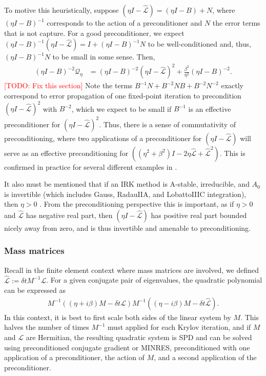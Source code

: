 \documentclass[review]{siamart}
\makeatletter
\newcommand{\todo}[1]{\textcolor{red}{[TODO\@: #1]}}
\makeatother
\begin{document}
To motive this heuristically, suppose $(\eta I - \widehat{\mathcal{L}}) = (\eta I - B)+N$,
where $(\eta I - B)^{-1}$ corresponds to the action of a preconditioner and $N$ the error
terms that is not capture. For a good preconditioner, we expect
$(\eta I - B)^{-1}(\eta I - \widehat{\mathcal{L}}) = I+(\eta I - B)^{-1}N$ to be
well-conditioned and, thus, $(\eta I - B)^{-1}N$ to be small in some sense. Then,
%
\begin{align*}
(\eta I - B)^{-2}\mathcal{Q}_\eta & = (\eta I - B)^{-2}(\eta I - \widehat{\mathcal{L}})^{2}
	+ \frac{\beta^2}{\eta^2}(\eta I - B)^{-2}.
\end{align*}
%
\todo{Fix this section}
Note the terms $B^{-1}N + B^{-2}NB + B^{-2}N^{-2}$ exactly correspond to error
propagation of one fixed-point iteration to precondition $(\eta I - \widehat{\mathcal{L}})^2$
with $B^{-2}$, which we expect to be small if $B^{-1}$ is an effective preconditioner
for $(\eta I - \widehat{\mathcal{L}})^2$. Thus, there is a sense of commutativity of
preconditioning, where two applications of a preconditioner for $(\eta I -
\widehat{\mathcal{L}})$ will serve as an effective preconditioning for
$((\eta^2+\beta^2)I - 2\eta \widehat{\mathcal{L}} + \widehat{\mathcal{L}}^2)$.
This is confirmed in practice for several different examples in . 

It also must be mentioned that if an IRK method is A-stable, irreducible, and
$A_0$ is invertible (which includes Gauss, RadauIIA, and LobattoIIIC integration),
then $\eta > 0$ \cite{hairer96}. From the preconditioning perspective this is
important, as if $\eta > 0$ and $\widehat{\mathcal{L}}$ has negative real part,
then $(\eta I - \widehat{\mathcal{L}})$ has positive real part bounded nicely
away from zero, and is thus invertible and amenable to preconditioning. 

\subsubsection{Mass matrices}

Recall in the finite element context where mass matrices are involved, we defined
$\widehat{\mathcal{L}} := \delta t M^{-1}\mathcal{L}$. For a given conjugate pair
of eigenvalues, the quadratic polynomial can be expressed as
%
\begin{align}\label{eq:scaleM}
M^{-1}((\eta + i\beta)M - \delta t{\mathcal{L}})M^{-1}((\eta - i\beta)M -
	\delta t\widehat{\mathcal{L}}).
\end{align}
%
In this context, it is best to first scale both sides of the linear system by $M$.
This halves the number of times $M^{-1}$ must applied for each Krylov iteration,
and if $M$ and $\mathcal{L}$ are Hermitian, the resulting quadratic system is SPD
and can be solved using preconditioned conjugate gradient or MINRES, preconditioned
with one application of a preconditioner, the action of $M$, and a second application
of the preconditioner.
\end{document}
